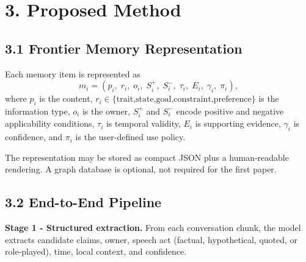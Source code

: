 \documentclass[10.5pt,a4paper]{article}
\begin{document}
\section{3. Proposed Method}

\subsection{3.1 Frontier Memory Representation}
Each memory item is represented as
\[
m_i=(p_i,\;r_i,\;o_i,\;S_i^{+},\;S_i^{-},\;\tau_i,\;E_i,\;\gamma_i,\;\pi_i),
\]
where $p_i$ is the content, $r_i\in\{\text{trait,state,goal,constraint,preference}\}$ is the information type, $o_i$ is the owner, $S_i^{+}$ and $S_i^{-}$ encode positive and negative applicability conditions, $\tau_i$ is temporal validity, $E_i$ is supporting evidence, $\gamma_i$ is confidence, and $\pi_i$ is the user-defined use policy.

The representation may be stored as compact JSON plus a human-readable rendering. A graph database is optional, not required for the first paper.

\subsection{3.2 End-to-End Pipeline}

\begin{center}
\end{center}

\textbf{Stage 1 - Structured extraction.} From each conversation chunk, the model extracts candidate claims, owner, speech act (factual, hypothetical, quoted, or role-played), time, local context, and confidence.
\end{document}
